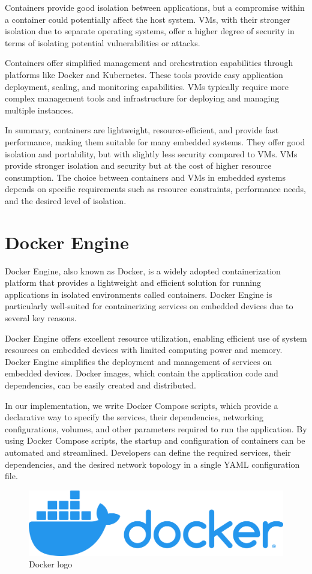 \documentclass[
12pt,
oneside, 
onehalfspacing, 
nolistspacing, 
parskip, 
chapterinoneline, 
]{AASTCOMPUTER}
\begin{document}
Containers provide good isolation between applications, but a compromise within a container could potentially affect the host system. VMs, with their stronger isolation due to separate operating systems, offer a higher degree of security in terms of isolating potential vulnerabilities or attacks.

Containers offer simplified management and orchestration capabilities through platforms like Docker and Kubernetes. These tools provide easy application deployment, scaling, and monitoring capabilities. VMs typically require more complex management tools and infrastructure for deploying and managing multiple instances.

In summary, containers are lightweight, resource-efficient, and provide fast performance, making them suitable for many embedded systems. They offer good isolation and portability, but with slightly less security compared to VMs. VMs provide stronger isolation and security but at the cost of higher resource consumption. The choice between containers and VMs in embedded systems depends on specific requirements such as resource constraints, performance needs, and the desired level of isolation.

\section{Docker Engine}
Docker Engine, also known as Docker, is a widely adopted containerization platform that provides a lightweight and efficient solution for running applications in isolated environments called containers. Docker Engine is particularly well-suited for containerizing services on embedded devices due to several key reasons.

Docker Engine offers excellent resource utilization, enabling efficient use of system resources on embedded devices with limited computing power and memory. Docker Engine simplifies the deployment and management of services on embedded devices. Docker images, which contain the application code and dependencies, can be easily created and distributed.

In our implementation, we write Docker Compose scripts, which provide a declarative way to specify the services, their dependencies, networking configurations, volumes, and other parameters required to run the application. By using Docker Compose scripts, the startup and configuration of containers can be automated and streamlined. Developers can define the required services, their dependencies, and the desired network topology in a single YAML configuration file.
\begin{figure}[h]
\centering
\includegraphics[scale=0.16]{Figures/docker_logo.png}
\caption[Docker logo]{Docker logo}
\label{fig:TCU}
\end{figure}
\end{document}
